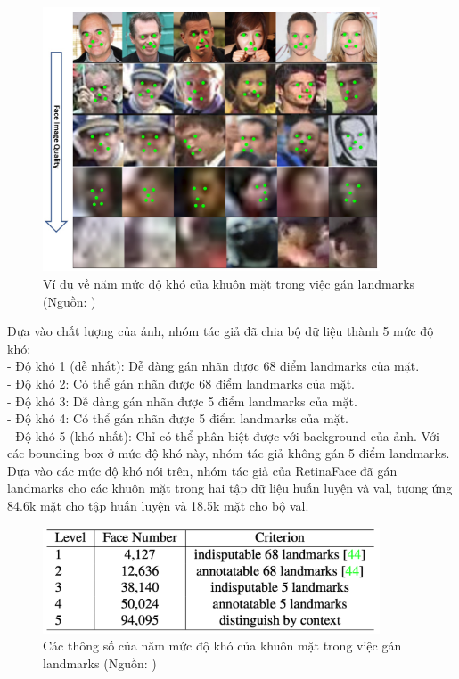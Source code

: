 {    \begin{figure}[H]
        \centering
        \includegraphics[width=10cm] {images/widerface_five_levels_lm_1}
        \caption{Ví dụ về năm mức độ khó của khuôn mặt trong việc gán landmarks (Nguồn: \cite{deng2020retinaface})}
        \label{fig:widerface_five_levels_lm_1}
    \end{figure}

    \noindent
    Dựa vào chất lượng của ảnh, nhóm tác giả đã chia bộ dữ liệu thành 5 mức độ khó: \\
    - Độ khó 1 (dễ nhất): Dễ dàng gán nhãn được 68 điểm landmarks của mặt. \\
    - Độ khó 2: Có thể gán nhãn được 68 điểm landmarks của mặt. \\
    - Độ khó 3: Dễ dàng gán nhãn được 5 điểm landmarks của mặt. \\
    - Độ khó 4: Có thể gán nhãn được 5 điểm landmarks của mặt. \\
    - Độ khó 5 (khó nhất): Chỉ có thể phân biệt được với background  của ảnh. Với các bounding box  ở mức độ khó này, nhóm tác giả không gán 5 điểm landmarks. \\
    Dựa vào các mức độ khó nói trên, nhóm tác giả của RetinaFace đã gán landmarks cho các khuôn mặt trong hai tập dữ liệu huấn luyện và val, tương ứng 84.6k mặt cho tập huấn luyện và 18.5k mặt cho bộ val.

    \begin{figure}[H]
        \centering
        \includegraphics[width=10cm] {images/widerface_five_levels_lm_2}
        \caption{Các thông số của năm mức độ khó của khuôn mặt trong việc gán landmarks (Nguồn: \cite{deng2020retinaface})}
        \label{fig:widerface_five_levels_lm_2}
    \end{figure}

}
